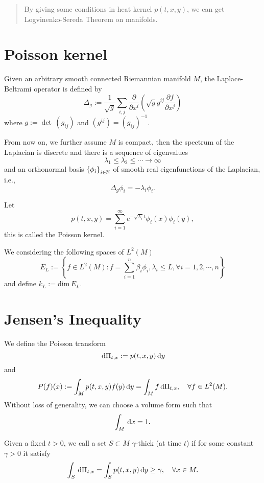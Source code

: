 \begin{abstract}
	By giving some conditions in heat kernel  $p(t,x,y)$, we can get Logvinenko-Sereda Theorem on manifolds.
\end{abstract}
\tableofcontents
\section{Poisson kernel}
Given an arbitrary smooth connected Riemannian manifold $M$, the Laplace-Beltrami operator is defined by 
\[
\Delta_g:=\frac{1}{\sqrt{g} }\sum_{i,j}^{} \frac{\partial}{\partial{x^i}}\left( \sqrt{g}g^{ij} \frac{\partial f}{\partial {x^{j}}}  \right) 
\]
where $g:=\det\, (g_{ij})$ and $(g^{ij})=(g_{ij})^{-1}$.

From now on, we further assume $M$ is compact, then  the spectrum of the Laplacian is discrete and there is a sequence of eigenvalues
\[
\lambda_1\le \lambda_2\le \cdots \to \infty
\] 
and an orthonormal basis $\left\{\phi_i\right\}_{i\in \mathbb{N}} $ of smooth real eigenfunctions of the Laplacian, i.e., 
\[
\Delta_g \phi_i=-\lambda_i \phi_i.
\] 

Let
\[
	p(t,x,y)=\sum_{i=1}^{\infty} e^{-\sqrt{ \lambda_i} t}\phi_i(x)\phi_{i}(y),
\] 
this is called the Poisson kernel.

We considering the following spaces of $L^2(M)$
\[
E_L:=\left\{f\in L^2(M):f=\sum_{i=1}^{n}\beta_i \phi_i,\lambda_i \le L,\forall i =1,2,\cdots ,n\right\} 
\] 
and define $k_L:=\mathrm{dim}\, E_L$.

\section{Jensen's Inequality}

We define the Poisson transform
\begin{equation}
	\,\mathrm{d} \Pi_{t,x}:= p(t,x,y)\,\mathrm{d} y\label{eqn:poisson-transform}
\end{equation}
and
\[
	P(f)(x):=\int_M p(t,x,y) f(y)\,\mathrm{d} y=\int_{M}f\,\mathrm{d} \Pi_{t,x},\quad \forall f\in L^2(M).
\]
Without loss of generality, we can choose a volume form such that
\begin{equation}
	\int_{M}\,\mathrm{d} x=1.
\end{equation}
\begin{definition}
	Given a fixed $t>0$, we call a set $S\subset M$ $\gamma$-thick (at time $t$) if for some constant $\gamma>0$ it satisfy
	\begin{equation}
		\int_S \,\mathrm{d} \Pi_{t,x} = \int_S p(t,x,y)\,\mathrm{d} y\ge \gamma,\quad  \forall x\in M.\label{eqn:thick}
	\end{equation}
\end{definition}

